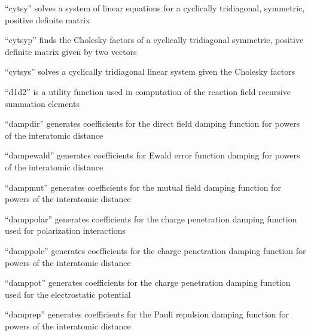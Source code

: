 \documentclass[letterpaper,11pt,english]{sphinxmanual}
\begin{document}

“cytsy” solves a system of linear equations for a cyclically
tridiagonal, symmetric, positive definite matrix


“cytsyp” finds the Cholesky factors of a cyclically tridiagonal
symmetric, positive definite matrix given by two vectors


“cytsys” solves a cyclically tridiagonal linear system
given the Cholesky factors


“d1d2” is a utility function used in computation of the
reaction field recursive summation elements


“dampdir” generates coefficients for the direct field damping
function for powers of the interatomic distance


“dampewald” generates coefficients for Ewald error function
damping for powers of the interatomic distance


“dampmut” generates coefficients for the mutual field damping
function for powers of the interatomic distance


“damppolar” generates coefficients for the charge penetration
damping function used for polarization interactions


“damppole” generates coefficients for the charge penetration
damping function for powers of the interatomic distance


“damppot” generates coefficients for the charge penetration
damping function used for the electrostatic potential


“damprep” generates coefficients for the Pauli repulsion
damping function for powers of the interatomic distance

\end{document}
